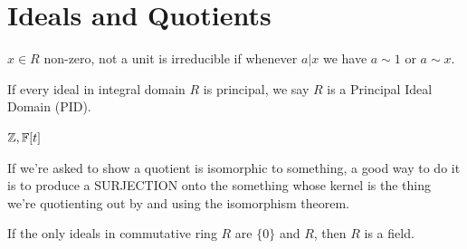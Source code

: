 \chapter{Ideals and Quotients}
\begin{definition}
    $x \in  R$ non-zero, not a unit is irreducible if whenever $a | x$ we have $a \sim 1$ or $a \sim x$.
\end{definition}
\begin{definition}
    If every ideal in integral domain $R$ is principal, we say $R$ is a Principal Ideal Domain (PID).
\end{definition}
\begin{eg}
    $\mathbb{Z}, \mathbb{F}[t]$
\end{eg}
If we're asked to show a quotient is isomorphic to something, a good way to do it is to produce a SURJECTION onto the something whose kernel is the thing we're quotienting out by and using the isomorphism theorem.
\begin{prop}
    
If the only ideals in commutative ring $R$ are $\{0\} $ and $R$, then $R$ is a field.
\end{prop}

